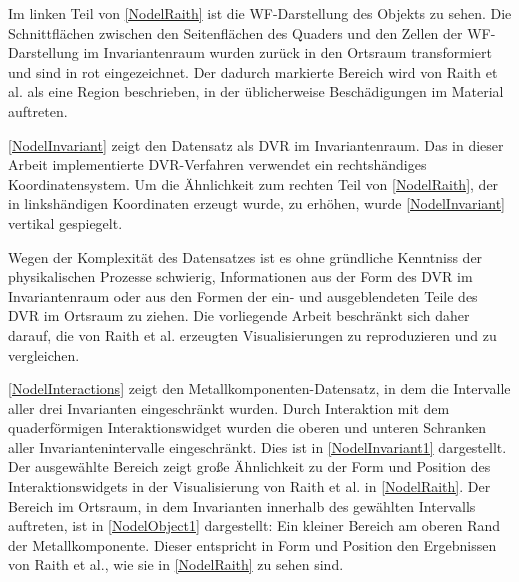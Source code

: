 \documentclass[a4paper,fontsize=12pt,toc=bib,parskip=half,ngerman]{scrartcl}
\begin{document}
Im linken Teil von \cref{NodelRaith} ist die WF-Darstellung des Objekts zu sehen. Die Schnittfl\"achen zwischen den Seitenfl\"achen des Quaders und den Zellen der WF-Darstellung im Invariantenraum wurden zur\"uck in den Ortsraum transformiert und sind in rot eingezeichnet. Der dadurch markierte Bereich wird von Raith et al. als eine Region beschrieben, in der \"ublicherweise Besch\"adigungen im Material auftreten.

\cref{NodelInvariant} zeigt den Datensatz als DVR im Invariantenraum. Das in dieser Arbeit implementierte DVR-Verfahren verwendet ein rechtsh\"andiges Koordinatensystem. Um die \"Ahnlichkeit zum rechten Teil von \cref{NodelRaith}, der in linksh\"andigen Koordinaten erzeugt wurde, zu erh\"ohen, wurde \cref{NodelInvariant} vertikal gespiegelt. 

Wegen der Komplexit\"at des Datensatzes ist es ohne gr\"undliche Kenntniss der physikalischen Prozesse schwierig, Informationen aus der Form des DVR im Invariantenraum oder aus den Formen der ein- und ausgeblendeten Teile des DVR im Ortsraum zu ziehen. Die vorliegende Arbeit beschr\"ankt sich daher darauf, die von Raith et al. erzeugten Visualisierungen zu reproduzieren und zu vergleichen.

\cref{NodelInteractions} zeigt den Metallkomponenten-Datensatz, in dem die Intervalle aller drei Invarianten eingeschr\"ankt wurden. 
Durch Interaktion mit dem quaderf\"ormigen Interaktionswidget wurden die oberen und unteren Schranken aller Invariantenintervalle eingeschr\"ankt. Dies ist in \cref{NodelInvariant1} dargestellt. Der ausgew\"ahlte Bereich zeigt gro{\ss}e \"Ahnlichkeit zu der Form und Position des Interaktionswidgets in der Visualisierung von Raith et al. in \cref{NodelRaith}. Der Bereich im Ortsraum, in dem Invarianten innerhalb des gew\"ahlten Intervalls auftreten, ist in \cref{NodelObject1} dargestellt: Ein kleiner Bereich am oberen Rand der Metallkomponente. Dieser entspricht in Form und Position den Ergebnissen von Raith et al., wie sie in \cref{NodelRaith} zu sehen sind.
\end{document}
